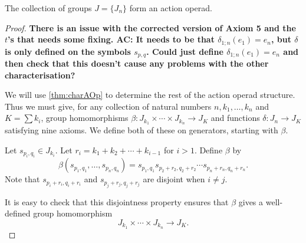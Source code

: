 \begin{thm}\label{J_aop}
The collection of groups $J = \{ J_{n} \}$ form an action operad.
\end{thm}
\begin{proof}
\textbf{There is an issue with the corrected version of Axiom 5 and the $t$'s that needs some fixing. AC: It needs to be that $\delta_{1;n}(e_1) = e_n$, but $\delta$ is only defined on the symbols $s_{p,q}$. Could just define $\delta_{1;n}(e_1) = e_n$ and then check that this doesn't cause any problems with the other characterisation?}

We will use \cref{thm:charAOp} to determine the rest of the action operad structure. Thus we must give, for any collection of natural numbers $n, k_{1}, \ldots, k_{n}$ and $K = \sum k_{i}$, group homomorphisms $\beta \colon J_{k_{1}} \times \cdots \times J_{k_{n}} \rightarrow J_{K}$ and functions $\delta \colon J_{n} \rightarrow J_{K}$ satisfying nine axioms. We define both of these on generators, starting with $\beta$.

Let $s_{p_{i}, q_{i}} \in J_{k_{i}}$. Let $r_{i} = k_{1} + k_{2} + \cdots + k_{i-1}$ for $i > 1$. Define $\beta$ by
  \[
    \beta(s_{p_{1}, q_{1}}, \ldots, s_{p_{n}, q_{n}}) = s_{p_{1}, q_{1}} s_{p_{2}+r_{2}, q_{2}+r_{2}} \cdots s_{p_{n}+r_{n}, q_{n}+r_{n}}.
  \]
Note that $s_{p_{i}+r_{i}, q_{i}+r_{i}}$ and $s_{p_{j}+r_{j}, q_{j}+r_{j}}$ are disjoint when $i \neq j$.

It is easy to check that this disjointness property ensures that $\beta$ gives a well-defined group homomorphism
  \[
    J_{k_{1}} \times \cdots \times J_{k_{n}} \rightarrow J_{K}.
  \]


\end{proof}
